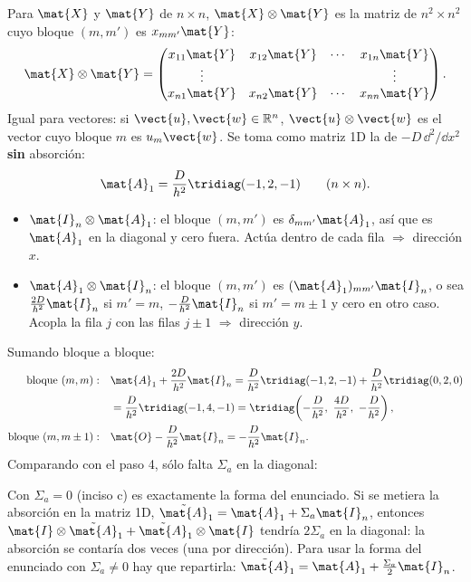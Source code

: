 Para $\mat{X}$ y $\mat{Y}$ de $n\times n$, $\mat{X}\otimes\mat{Y}$ es la matriz de $n^2\times n^2$ cuyo
bloque $(m, m')$ es $x_{mm'}\mat{Y}$:
\[
  \mat{X}\otimes\mat{Y} =
  \begin{pmatrix}
    x_{11}\mat{Y} & x_{12}\mat{Y} & \cdots & x_{1n}\mat{Y}\\
    \vdots        &               &        & \vdots       \\
    x_{n1}\mat{Y} & x_{n2}\mat{Y} & \cdots & x_{nn}\mat{Y}
  \end{pmatrix}.
\]
Igual para vectores: si $\vect{u}, \vect{w}\in\mathbb{R}^n$, $\vect{u}\otimes\vect{w}$ es el vector cuyo bloque
$m$ es $u_m\vect{w}$. Se toma como matriz 1D la de $-D\,\dd^2/\dd x^2$ \textbf{sin} absorción:
\[
  \mat{A}_1 = \frac{D}{h^2}\tridiag(-1, 2, -1)\qquad (n\times n).
\]
\begin{itemize}
  \item $\mat{I}_n\otimes\mat{A}_1$: el bloque $(m, m')$ es $\delta_{mm'}\mat{A}_1$, así que es
        $\mat{A}_1$ en la diagonal y cero fuera. Actúa dentro de cada fila $\Rightarrow$ dirección $x$.
  \item $\mat{A}_1\otimes\mat{I}_n$: el bloque $(m, m')$ es $(\mat{A}_1)_{mm'}\mat{I}_n$, o sea
        $\frac{2D}{h^2}\mat{I}_n$ si $m' = m$, $-\frac{D}{h^2}\mat{I}_n$ si $m' = m\pm1$ y cero en otro caso.
        Acopla la fila $j$ con las filas $j\pm1$ $\Rightarrow$ dirección $y$.
\end{itemize}
Sumando bloque a bloque:
\begin{align*}
  \text{bloque } (m, m):&\quad \mat{A}_1 + \frac{2D}{h^2}\mat{I}_n
     = \frac{D}{h^2}\tridiag(-1, 2, -1) + \frac{D}{h^2}\tridiag(0, 2, 0)\\
  &\quad= \frac{D}{h^2}\tridiag(-1, 4, -1)
     = \tridiag\!\left(-\frac{D}{h^2},\ \frac{4D}{h^2},\ -\frac{D}{h^2}\right),\\
  \text{bloque } (m, m\pm1):&\quad \mat{O} - \frac{D}{h^2}\mat{I}_n = -\frac{D}{h^2}\mat{I}_n .
\end{align*}
Comparando con el paso 4, sólo falta $\Sigma_a$ en la diagonal:

\begin{ojo}
Con $\Sigma_a = 0$ (inciso c) es exactamente la forma del enunciado. Si se metiera la absorción en la matriz
1D, $\tilde{\mat{A}}_1 = \mat{A}_1 + \Sigma_a\mat{I}_n$, entonces
$\mat{I}\otimes\tilde{\mat{A}}_1 + \tilde{\mat{A}}_1\otimes\mat{I}$ tendría $2\Sigma_a$ en la diagonal:
la absorción se contaría dos veces (una por dirección). Para usar la forma del enunciado con
$\Sigma_a\neq0$ hay que repartirla: $\tilde{\mat{A}}_1 = \mat{A}_1 + \frac{\Sigma_a}{2}\mat{I}_n$.
\end{ojo}

